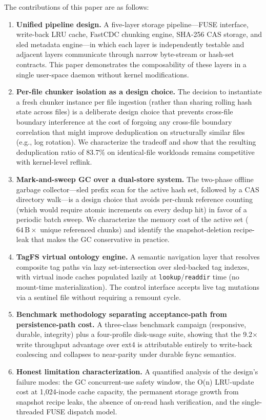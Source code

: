 \documentclass[5p,times]{elsarticle}
\begin{document}
The contributions of this paper are as follows:
\begin{enumerate}
\item \textbf{Unified pipeline design.} A five-layer storage pipeline---FUSE
  interface, write-back LRU cache, FastCDC chunking engine, SHA-256 CAS
  storage, and sled metadata engine---in which each layer is independently
  testable and adjacent layers communicate through narrow byte-stream or
  hash-set contracts.  This paper demonstrates the composability of these
  layers in a single user-space daemon without kernel modifications.

\item \textbf{Per-file chunker isolation as a design choice.} The
  decision to instantiate a fresh chunker instance per file ingestion
  (rather than sharing rolling hash state across files) is a deliberate
  design choice that prevents cross-file boundary interference at the cost
  of forgoing any cross-file boundary correlation that might improve
  deduplication on structurally similar files (e.g., log rotation).
  We characterize the tradeoff and show that the resulting deduplication
  ratio of 83.7\% on identical-file workloads remains competitive with
  kernel-level reflink.

\item \textbf{Mark-and-sweep GC over a dual-store system.} The two-phase
  offline garbage collector---sled prefix scan for the active hash set,
  followed by a CAS directory walk---is a design choice that avoids
  per-chunk reference counting (which would require atomic increments on
  every dedup hit) in favor of a periodic batch sweep.  We characterize
  the memory cost of the active set ($64\,\mathrm{B} \times$ unique
  referenced chunks) and identify the snapshot-deletion recipe-leak that
  makes the GC conservative in practice.

\item \textbf{TagFS virtual ontology engine.} A semantic navigation layer
  that resolves composite tag paths via lazy set-intersection over
  sled-backed tag indexes, with virtual inode caches populated lazily at
  \texttt{lookup}/\texttt{readdir} time (no mount-time materialization).
  The control interface accepts live tag mutations via a sentinel file
  without requiring a remount cycle.

\item \textbf{Benchmark methodology separating acceptance-path from
  persistence-path cost.} A three-class benchmark campaign (responsive,
  durable, integrity) plus a four-profile disk-usage suite, showing that
  the 9.2$\times$ write throughput advantage over ext4 is attributable
  entirely to write-back coalescing and collapses to near-parity under
  durable fsync semantics.

\item \textbf{Honest limitation characterization.} A quantified analysis
  of the design's failure modes: the GC concurrent-use safety window,
  the O(n) LRU-update cost at 1,024-inode cache capacity, the
  permanent storage growth from snapshot recipe leaks, the absence of
  on-read hash verification, and the single-threaded FUSE dispatch model.
\end{enumerate}
\end{document}
